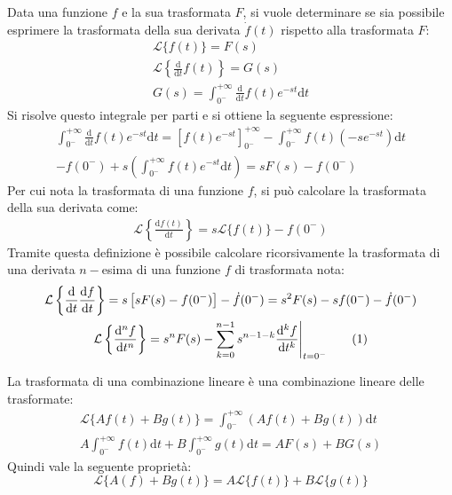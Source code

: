 \documentclass{article}
\newcommand{\df}{\mathrm{d}}
\newcommand{\tageq}{\tag{\stepcounter{equation}\theequation}}
\numberwithin{equation}{subsection}
\begin{document}
Data una funzione $f$ e la sua trasformata $F$, si vuole determinare se sia possibile esprimere la trasformata della sua derivata $\dot f(t)$ rispetto alla trasformata $F$:
\begin{gather*}
    \mathcal{L}\{f(t)\}=F(s)\\
    \mathcal{L}\left\{\displaystyle\frac{\df}{\df t}f(t)\right\}=G(s)\\
    G(s)=\displaystyle\int_{0^-}^{+\infty}\frac{\df}{\df t}f(t)e^{-st}\df t
\end{gather*}
Si risolve questo integrale per parti e si ottiene la seguente espressione:
\begin{gather*}
    \displaystyle\int_{0^-}^{+\infty}\frac{\df}{\df t}f(t)e^{-st}\df t=\left[f(t)e^{-st}\right]^{+\infty}_{0^-}-\int_{0^-}^{+\infty}f(t)(-se^{-st})\df t\\
    \displaystyle-f(0^-)+s\left(\int_{0^-}^{+\infty}f(t)e^{-st}\df t\right)=sF(s)-f(0^-) 
\end{gather*}
Per cui nota la trasformata di una funzione $f$, si può calcolare la trasformata della sua derivata come:
\begin{gather}
    \mathcal{L}\left\{\displaystyle\frac{\df f(t)}{\df t}\right\}=s\mathcal{L}\{f(t)\}-f(0^-)
\end{gather}
Tramite questa definizione è possibile calcolare ricorsivamente la trasformata di una derivata $n-$esima di una funzione $f$ di trasformata nota:
\begin{gather*}
    \mathcal{L}\left\{\displaystyle\frac{\df}{\df t}\frac{\df f}{\df t}\right\}=s\left[sF(s)-f(0^-)\right]-\dot f(0^-)=s^2F(s)-sf(0^-)-\dot f(0^-)\\
    \mathcal{L}\left\{\displaystyle\frac{\df^nf}{\df t^n}\right\}=s^nF(s)-\sum_{k=0}^{n-1}s^{n-1-k}\frac{\df^kf}{\df t^k}\Bigg|_{t=0^-}\tageq
\end{gather*}

La trasformata di una combinazione lineare è una combinazione lineare delle trasformate:
\begin{gather*}
    \mathcal{L}\{Af(t)+Bg(t)\}=\displaystyle\int_{0^-}^{+\infty}\left(Af(t)+Bg(t)\right)\df t\\
    A\int_{0^-}^{+\infty}f(t)\df t+B\int_{0^-}^{+\infty}g(t)\df t=AF(s)+BG(s)
\end{gather*}
Quindi vale la seguente proprietà:
\begin{equation}
    \mathcal{L}\{A(f)+Bg(t)\}=A\mathcal{L}\{f(t)\}+B\mathcal{L}\{g(t)\}
\end{equation}
\end{document}
